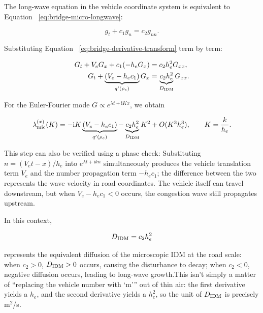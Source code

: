 \documentclass[11pt,a4paper,openany]{book}
\numberwithin{equation}{chapter}
\numberwithin{figure}{chapter}
\numberwithin{table}{chapter}
\begin{document}
The long-wave equation in the vehicle coordinate system is equivalent to Equation ~\eqref{eq:bridge-micro-longwave}:

\begin{equation}
g_t+c_1g_n=c_2g_{nn}.
\label{eq:bridge-lagrangian-pde}
\end{equation}

Substituting Equation ~\eqref{eq:bridge-derivative-transform} term by term:

\begin{align}
G_t+V_eG_x+c_1(-h_eG_x)&=c_2h_e^2G_{xx},\\
G_t+\underbrace{(V_e-h_ec_1)}_{q'(\rho_e)}G_x
&=\underbrace{c_2h_e^2}_{D_{\rm IDM}}G_{xx}.
\label{eq:bridge-eulerian-pde}
\end{align}

For the Euler-Fourier mode $G\propto e^{\lambda t+\mathrm{i}Kx}$, we obtain

\begin{equation}
\lambda_{\rm mic}^{(x)}(K)
=-\mathrm{i}K\underbrace{(V_e-h_ec_1)}_{q'(\rho_e)}
-\underbrace{c_2h_e^2}_{D_{\rm IDM}}K^2
+O(K^3h_e^3),
\qquad K=\frac{k}{h_e}.
\label{eq:bridge-eulerian-longwave}
\end{equation}

This step can also be verified using a phase check: Substituting $n=(V_et-x)/h_e$ into $e^{\lambda t+\mathrm{i}kn}$ simultaneously produces the vehicle translation term $V_e$ and the number propagation term $-h_ec_1$; the difference between the two represents the wave velocity in road coordinates. The vehicle itself can travel downstream, but when $V_e-h_ec_1<0$ occurs, the congestion wave still propagates upstream.




In this context,

\begin{equation}
D_{\rm IDM}=c_2h_e^2
\label{eq:bridge-idm-diffusion}
\end{equation}

represents the equivalent diffusion of the microscopic IDM at the road scale: when $c_2>0$, $D_{\rm IDM}>0$ occurs, causing the disturbance to decay; when $c_2<0$, negative diffusion occurs, leading to long-wave growth.This isn’t simply a matter of “replacing the vehicle number with ‘m’” out of thin air: the first derivative yields a $h_e$, and the second derivative yields a $h_e^2$, so the unit of $D_{\rm IDM}$ is precisely m$^2$/s.
\end{document}
